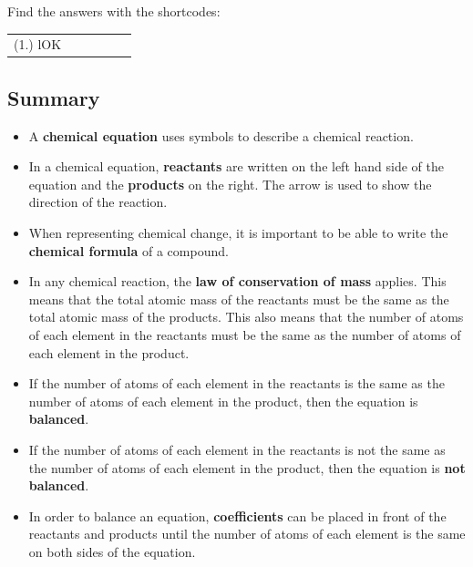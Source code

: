 \par {} Find the answers with the shortcodes:
 \par \begin{tabular}[h]{cccccc}
 (1.) lOK  & \end{tabular}
            \subsection{ Summary}
            \nopagebreak
      \label{m38727*id67171}\begin{itemize}[noitemsep]
            \label{m38727*uid36}\item A \textbf{chemical equation} uses symbols to describe a chemical reaction.
\label{m38727*uid37}\item In a chemical equation, \textbf{reactants} are written on the left hand side of the equation and the \textbf{products} on the right. The arrow is used to show the direction of the reaction.
\label{m38727*uid38}\item When representing chemical change, it is important to be able to write the \textbf{chemical formula} of a compound.
\label{m38727*uid39}\item In any chemical reaction, the \textbf{law of conservation of mass} applies. This means that the total atomic mass of the reactants must be the same as the total atomic mass of the products. This also means that the number of atoms of each element in the reactants must be the same as the number of atoms of each element in the product.
\label{m38727*uid40}\item If the number of atoms of each element in the reactants is the same as the number of atoms of each element in the product, then the equation is \textbf{balanced}.
\label{m38727*uid41}\item If the number of atoms of each element in the reactants is not the same as the number of atoms of each element in the product, then the equation is \textbf{not balanced}.
\label{m38727*uid42}\item In order to balance an equation, \textbf{coefficients} can be placed in front of the reactants and products until the number of atoms of each element is the same on both sides of the equation.
\end{itemize}
\label{m38727*secfhsst!!!underscore!!!id1434}
